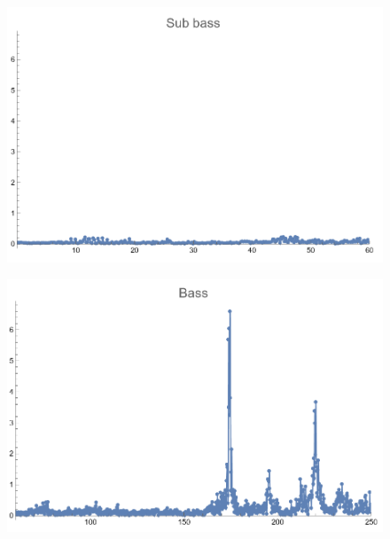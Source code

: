\documentclass[12pt, letterpaper]{article}
\begin{document}
\begin{figure}[H]
  \centering
  \begin{minipage}{.5\textwidth}
    \centering
    \includegraphics[width=.9\linewidth]{imgs/Cancion3/subbass.png}
    \label{fig:03b}
  \end{minipage}%
  \begin{minipage}{.5\textwidth}
    \centering
    \includegraphics[width=.9\linewidth]{imgs/Cancion3/bass.png}
    \label{fig:03c}
  \end{minipage}
\end{figure}
\end{document}
